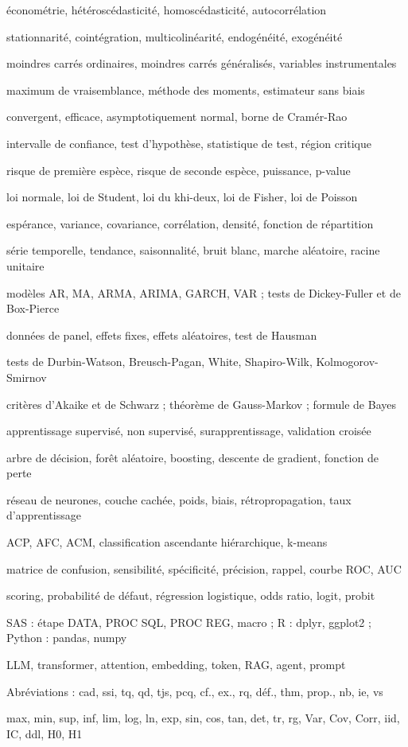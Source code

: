 \documentclass[11pt]{article}
\makeatletter
\newcommand{\aecrire}[1]{\par\noindent\begin{minipage}{\linewidth}\raggedright #1\end{minipage}\par\vspace{2pt}{\color{fiche@roseclair}\rule{\linewidth}{.6pt}}\par\vspace{5pt}}
\makeatother
\begin{document}
\aecrire{économétrie, hétéroscédasticité, homoscédasticité, autocorrélation}
\aecrire{stationnarité, cointégration, multicolinéarité, endogénéité, exogénéité}
\aecrire{moindres carrés ordinaires, moindres carrés généralisés, variables instrumentales}
\aecrire{maximum de vraisemblance, méthode des moments, estimateur sans biais}
\aecrire{convergent, efficace, asymptotiquement normal, borne de Cramér-Rao}
\aecrire{intervalle de confiance, test d'hypothèse, statistique de test, région critique}
\aecrire{risque de première espèce, risque de seconde espèce, puissance, p-value}
\aecrire{loi normale, loi de Student, loi du khi-deux, loi de Fisher, loi de Poisson}
\aecrire{espérance, variance, covariance, corrélation, densité, fonction de répartition}
\aecrire{série temporelle, tendance, saisonnalité, bruit blanc, marche aléatoire, racine unitaire}
\aecrire{modèles AR, MA, ARMA, ARIMA, GARCH, VAR ; tests de Dickey-Fuller et de Box-Pierce}
\aecrire{données de panel, effets fixes, effets aléatoires, test de Hausman}
\aecrire{tests de Durbin-Watson, Breusch-Pagan, White, Shapiro-Wilk, Kolmogorov-Smirnov}
\aecrire{critères d'Akaike et de Schwarz ; théorème de Gauss-Markov ; formule de Bayes}
\aecrire{apprentissage supervisé, non supervisé, surapprentissage, validation croisée}
\aecrire{arbre de décision, forêt aléatoire, boosting, descente de gradient, fonction de perte}
\aecrire{réseau de neurones, couche cachée, poids, biais, rétropropagation, taux d'apprentissage}
\aecrire{ACP, AFC, ACM, classification ascendante hiérarchique, k-means}
\aecrire{matrice de confusion, sensibilité, spécificité, précision, rappel, courbe ROC, AUC}
\aecrire{scoring, probabilité de défaut, régression logistique, odds ratio, logit, probit}
\aecrire{SAS : étape DATA, PROC SQL, PROC REG, macro ; R : dplyr, ggplot2 ; Python : pandas, numpy}
\aecrire{LLM, transformer, attention, embedding, token, RAG, agent, prompt}
\aecrire{Abréviations : cad, ssi, tq, qd, tjs, pcq, cf., ex., rq, déf., thm, prop., nb, ie, vs}
\aecrire{max, min, sup, inf, lim, log, ln, exp, sin, cos, tan, det, tr, rg, Var, Cov, Corr, iid, IC, ddl, H0, H1}

\clearpage
{}
\end{document}
